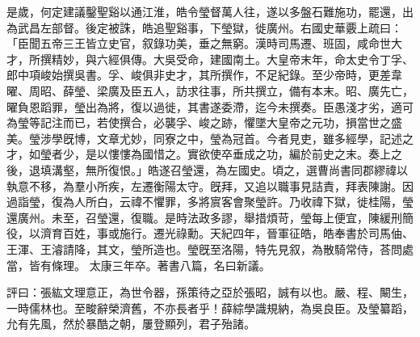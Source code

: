 \begin{pinyinscope}
 
是歲，何定建議鑿聖谿以通江淮，皓令瑩督萬人往，遂以多盤石難施功，罷還，出為武昌左部督。後定被誅，皓追聖谿事，下瑩獄，徙廣州。右國史華覈上疏曰：「臣聞五帝三王皆立史官，叙錄功美，垂之無窮。漢時司馬遷、班固，咸命世大才，所撰精妙，與六經俱傳。大吳受命，建國南土。大皇帝末年，命太史令丁孚、郎中項峻始撰吳書。孚、峻俱非史才，其所撰作，不足紀錄。至少帝時，更差韋曜、周昭、薛瑩、梁廣及臣五人，訪求往事，所共撰立，備有本末。昭、廣先亡，曜負恩蹈罪，瑩出為將，復以過徙，其書遂委滯，迄今未撰奏。臣愚淺才劣，適可為瑩等記注而已，若使撰合，必襲孚、峻之跡，懼墜大皇帝之元功，損當世之盛美。瑩涉學旣博，文章尤妙，同寮之中，瑩為冠首。今者見吏，雖多經學，記述之才，如瑩者少，是以慺慺為國惜之。實欲使卒垂成之功，編於前史之末。奏上之後，退填溝壑，無所復恨。」皓遂召瑩還，為左國史。頃之，選曹尚書同郡繆禕以執意不移，為羣小所疾，左遷衡陽太守。旣拜，又追以職事見詰責，拜表陳謝。因過詣瑩，復為人所白，云禕不懼罪，多將賔客會聚瑩許。乃收禕下獄，徙桂陽，瑩還廣州。未至，召瑩還，復職。是時法政多謬，舉措煩苛，瑩每上便宜，陳緩刑簡役，以濟育百姓，事或施行。遷光祿勳。天紀四年，晉軍征皓，皓奉書於司馬伷、王渾、王濬請降，其文，瑩所造也。瑩旣至洛陽，特先見叙，為散騎常侍，荅問處當，皆有條理。
 太康三年卒。著書八篇，名曰新議。
 
 
 
 
 評曰：張紘文理意正，為世令器，孫策待之亞於張昭，誠有以也。嚴、程、闞生，一時儒林也。至畯辭榮濟舊，不亦長者乎！薛綜學識規納，為吳良臣。及瑩纂蹈，允有先風，然於暴酷之朝，屢登顯列，君子殆諸。
 
 
\end{pinyinscope}